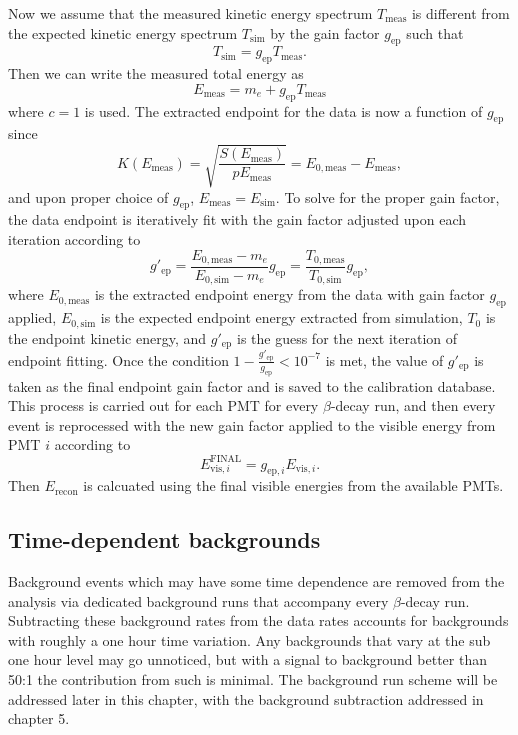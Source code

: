 Now we assume that the measured kinetic energy spectrum $T_{\mathrm{meas}}$ is different from the expected
kinetic energy spectrum $T_{\mathrm{sim}}$ by the gain factor $g_{\mathrm{ep}}$ such that
%
\begin{equation}
  T_{\mathrm{sim}} = g_{\mathrm{ep}} T_{\mathrm{meas}}.
\end{equation}
Then we can write the
measured total energy as
\begin{equation}
  E_{\mathrm{meas}} = m_e + g_{\mathrm{ep}}T_{\mathrm{meas}}
\end{equation}
where $c = 1$ is used. The extracted endpoint for the data is now a function of $g_{\mathrm{ep}}$
since
\begin{equation}
  K(E_{\mathrm{meas}}) = \sqrt{\frac{S(E_{\mathrm{meas}})}{pE_{\mathrm{meas}}}} = E_{0,\mathrm{meas}}-E_{\mathrm{meas}},
\end{equation}
and upon proper choice of $g_{\mathrm{ep}}$, $E_{\mathrm{meas}}=E_{\mathrm{sim}}$. To solve for
the proper gain factor, the data endpoint is iteratively fit with the gain factor adjusted upon each iteration
according to
%
\begin{equation}
  g'_{\mathrm{ep}} = \frac{ E_{0,\mathrm{meas}}- m_e}{ E_{0,\mathrm{sim}}- m_e}g_{\mathrm{ep}} =  \frac{ T_{0,\mathrm{meas}}}{ T_{0,\mathrm{sim}}}g_{\mathrm{ep}}, 
\end{equation}
%
where $E_{0,\mathrm{meas}}$ is the extracted endpoint energy from the data with gain factor $g_{\mathrm{ep}}$ applied,
$E_{0,\mathrm{sim}}$ is the expected endpoint energy extracted from simulation, $T_0$ is the endpoint kinetic energy,
and $g'_{\mathrm{ep}}$ is the guess for the next iteration of endpoint fitting.
Once the condition $1-\frac{g'_{\mathrm{ep}}}{g_{\mathrm{ep}}}<10^{-7}$ is met, the value of $g'_{\mathrm{ep}}$ is taken as the final
endpoint gain factor and is saved to the calibration database. This process is carried out for each PMT for every
$\beta$-decay run, and then every event is reprocessed with the new gain factor applied to the visible energy from PMT
$i$ according to
%
\begin{equation}
  E_{\mathrm{vis},i}^{\mathrm{FINAL}} = g_{\mathrm{ep},i} E_{\mathrm{vis},i}.
\end{equation}
Then $E_{\mathrm{recon}}$ is calcuated using the final visible energies from the available PMTs.



\subsection{Time-dependent backgrounds}
Background events which may have some time dependence are removed from the analysis
via dedicated background runs that accompany every $\beta$-decay run.
Subtracting these background rates from the data rates accounts for backgrounds
with roughly a one hour time variation.
Any backgrounds that vary at the sub one hour level may go unnoticed, but
with a signal to background better than 50:1 the contribution from such is minimal.
The background run scheme will be addressed later in this chapter, with the background
subtraction addressed in chapter 5. 

